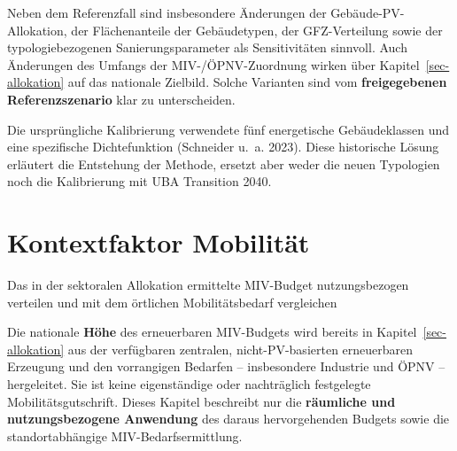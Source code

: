 \documentclass[
  ngerman,
  a4paper,
  DIV=11]{scrreprt}
\begin{document}
Neben dem Referenzfall sind insbesondere Änderungen der
Gebäude-PV-Allokation, der Flächenanteile der Gebäudetypen, der
GFZ-Verteilung sowie der typologiebezogenen Sanierungsparameter als
Sensitivitäten sinnvoll. Auch Änderungen des Umfangs der
MIV-/ÖPNV-Zuordnung wirken über Kapitel~\ref{sec-allokation} auf das
nationale Zielbild. Solche Varianten sind vom \textbf{freigegebenen
Referenzszenario} klar zu unterscheiden.

\begin{tcolorbox}[enhanced jigsaw, arc=.35mm, bottomrule=.15mm, bottomtitle=1mm, breakable, colback=white, colbacktitle=quarto-callout-note-color!10!white, colframe=quarto-callout-note-color-frame, coltitle=black, left=2mm, leftrule=.75mm, opacityback=0, opacitybacktitle=0.6, rightrule=.15mm, title=\textcolor{quarto-callout-note-color}{\faInfo}\hspace{0.5em}{Historische Einordnung}, titlerule=0mm, toprule=.15mm, toptitle=1mm]

Die ursprüngliche Kalibrierung verwendete fünf energetische
Gebäudeklassen und eine spezifische Dichtefunktion (Schneider u.~a.
2023). Diese historische Lösung erläutert die Entstehung der Methode,
ersetzt aber weder die neuen Typologien noch die Kalibrierung mit UBA
Transition 2040.

\end{tcolorbox}

\chapter{Kontextfaktor Mobilität}\label{sec-kontext-mobilitaet}

Das in der sektoralen Allokation ermittelte MIV-Budget nutzungsbezogen
verteilen und mit dem örtlichen Mobilitätsbedarf vergleichen

Die nationale \textbf{Höhe} des erneuerbaren MIV-Budgets wird bereits in
Kapitel~\ref{sec-allokation} aus der verfügbaren zentralen,
nicht-PV-basierten erneuerbaren Erzeugung und den vorrangigen Bedarfen
-- insbesondere Industrie und ÖPNV -- hergeleitet. Sie ist keine
eigenständige oder nachträglich festgelegte Mobilitätsgutschrift. Dieses
Kapitel beschreibt nur die \textbf{räumliche und nutzungsbezogene
Anwendung} des daraus hervorgehenden Budgets sowie die standortabhängige
MIV-Bedarfsermittlung.
\end{document}
